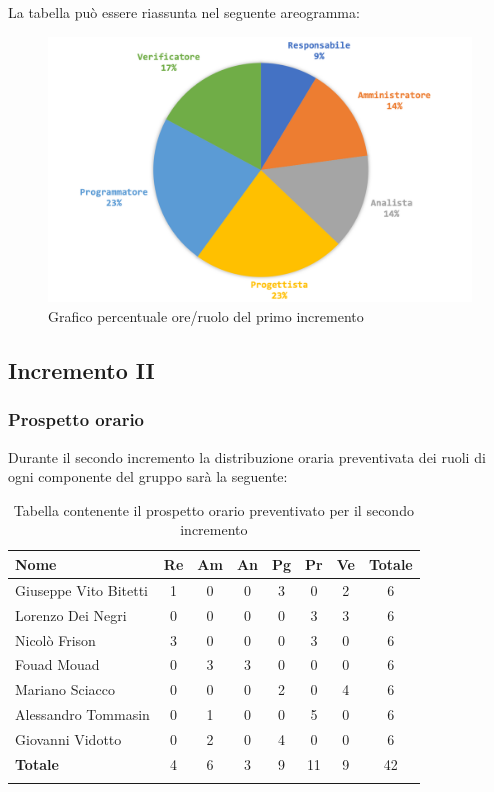 		La tabella può essere riassunta nel seguente areogramma:
		\begin{figure}[H]
			\centering
			\includegraphics[width=0.8\linewidth]{./images/preventivo/incremento1-2.png}
			\caption{Grafico percentuale ore/ruolo del primo incremento}
			\label{fig:grafico costi ruolo incremento I}
		\end{figure}
	
	
	
	\subsection{Incremento II}
		\subsubsection{Prospetto orario}
		Durante il secondo incremento la distribuzione oraria preventivata dei ruoli di ogni componente del gruppo sarà la seguente:
		
		\begin{longtable}{|l|c|c|c|c|c|c|c|}
			\hline
			\rowcolor{lighter-grayer}
			\textbf{Nome} & \textbf{Re} & \textbf{Am} & \textbf{An} & \textbf{Pg}  & \textbf{Pr}   & \textbf{Ve} & \textbf{Totale} \\
			\hline
			\endfirsthead
			
			\hline
			Giuseppe Vito Bitetti 		 & 1 & 0 & 0 & 3 & 0 & 2 & 6\\
			\hline
			\hline
			Lorenzo Dei Negri			 & 0 & 0 & 0 & 0 & 3 & 3 & 6\\
			\hline
			\hline
			Nicolò Frison				    & 3 & 0 & 0 & 0 & 3 & 0 & 6\\
			\hline
			\hline
			Fouad Mouad 				 & 0 & 3 & 3 & 0 & 0 & 0 & 6\\
			\hline
			\hline
			Mariano Sciacco 			 & 0 & 0 & 0 & 2 & 0 & 4 & 6\\
			\hline
			\hline
			Alessandro Tommasin    & 0 & 1 & 0 & 0 & 5 & 0 & 6\\
			\hline
			\hline
			Giovanni Vidotto 			 & 0 & 2 & 0 & 4 & 0 & 0 & 6\\
			\hline 
			\textbf{Totale}			 		& 4 & 6 & 3 & 9 & 11 & 9 & 42\\
			\hline
			\caption{Tabella contenente il prospetto orario preventivato per il secondo incremento}
		\end{longtable}
		\pagebreak
		
